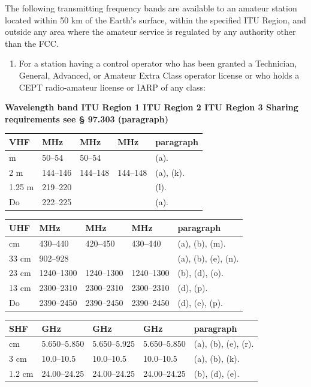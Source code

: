 \documentclass[
  letterpaper,
  DIV=11,
  numbers=noendperiod]{scrreport}
\providecommand{\tightlist}{%
  \setlength{\itemsep}{0pt}\setlength{\parskip}{0pt}}\usepackage{longtable,booktabs,array}
\begin{document}
The following transmitting frequency bands are available to an amateur
station located within 50 km of the Earth's surface, within the
specified ITU Region, and outside any area where the amateur service is
regulated by any authority other than the FCC.

\begin{enumerate}
\def\labelenumi{(\alph{enumi})}
\tightlist
\item
  For a station having a control operator who has been granted a
  Technician, General, Advanced, or Amateur Extra Class operator license
  or who holds a CEPT radio-amateur license or IARP of any class:
\end{enumerate}

\textbf{Wavelength band ITU Region 1 ITU Region 2 ITU Region 3 Sharing
requirements see § 97.303 (paragraph)}

\begin{longtable}[]{@{}lllll@{}}
\toprule\noalign{}
VHF & MHz & MHz & MHz & paragraph \\
\midrule\noalign{}
\endhead
\bottomrule\noalign{}
\endlastfoot
6 m & 50--54 & 50--54 & & (a). \\
2 m & 144--146 & 144--148 & 144--148 & (a), (k). \\
1.25 m & 219--220 & & & (l). \\
Do & 222--225 & & & (a). \\
\end{longtable}

\begin{longtable}[]{@{}lllll@{}}
\toprule\noalign{}
UHF & MHz & MHz & MHz & paragraph \\
\midrule\noalign{}
\endhead
\bottomrule\noalign{}
\endlastfoot
70 cm & 430--440 & 420--450 & 430--440 & (a), (b), (m). \\
33 cm & 902--928 & & & (a), (b), (e), (n). \\
23 cm & 1240--1300 & 1240--1300 & 1240--1300 & (b), (d), (o). \\
13 cm & 2300--2310 & 2300--2310 & 2300--2310 & (d), (p). \\
Do & 2390--2450 & 2390--2450 & 2390--2450 & (d), (e), (p). \\
\end{longtable}

\begin{longtable}[]{@{}lllll@{}}
\toprule\noalign{}
SHF & GHz & GHz & GHz & paragraph \\
\midrule\noalign{}
\endhead
\bottomrule\noalign{}
\endlastfoot
5 cm & 5.650--5.850 & 5.650--5.925 & 5.650--5.850 & (a), (b), (e),
(r). \\
3 cm & 10.0--10.5 & 10.0--10.5 & 10.0--10.5 & (a), (b), (k). \\
1.2 cm & 24.00--24.25 & 24.00--24.25 & 24.00--24.25 & (b), (d), (e). \\
\end{longtable}
\end{document}
